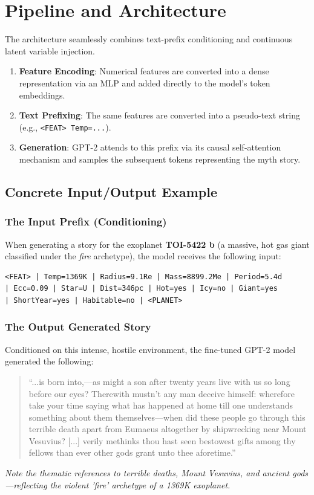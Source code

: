 \documentclass[12pt,a4paper]{report}
\begin{document}
\chapter{Pipeline and Architecture}

The architecture seamlessly combines text-prefix conditioning and continuous latent variable injection.

\begin{enumerate}
    \item \textbf{Feature Encoding}: Numerical features are converted into a dense representation via an MLP and added directly to the model's token embeddings.
    \item \textbf{Text Prefixing}: The same features are converted into a pseudo-text string (e.g., \texttt{<FEAT> Temp=...}).
    \item \textbf{Generation}: GPT-2 attends to this prefix via its causal self-attention mechanism and samples the subsequent tokens representing the myth story.
\end{enumerate}

\section{Concrete Input/Output Example}
\subsection*{The Input Prefix (Conditioning)}
When generating a story for the exoplanet \textbf{TOI-5422 b} (a massive, hot gas giant classified under the \textit{fire} archetype), the model receives the following input:

\begin{verbatim}
<FEAT> | Temp=1369K | Radius=9.1Re | Mass=8899.2Me | Period=5.4d 
| Ecc=0.09 | Star=U | Dist=346pc | Hot=yes | Icy=no | Giant=yes 
| ShortYear=yes | Habitable=no | <PLANET>
\end{verbatim}

\subsection*{The Output Generated Story}
Conditioned on this intense, hostile environment, the fine-tuned GPT-2 model generated the following:

\begin{quote}
``...is born into,—as might a son after twenty years live with us so long before our eyes? Therewith mustn't any man deceive himself: wherefore take your time saying what has happened at home till one understands something about them themselves—when did these people go through this terrible death apart from Eumaeus altogether by shipwrecking near Mount Vesuvius? [...] verily methinks thou hast seen bestowest gifts among thy fellows than ever other gods grant unto thee aforetime.''
\end{quote}
\textit{Note the thematic references to terrible deaths, Mount Vesuvius, and ancient gods—reflecting the violent 'fire' archetype of a 1369K exoplanet.}
\end{document}

